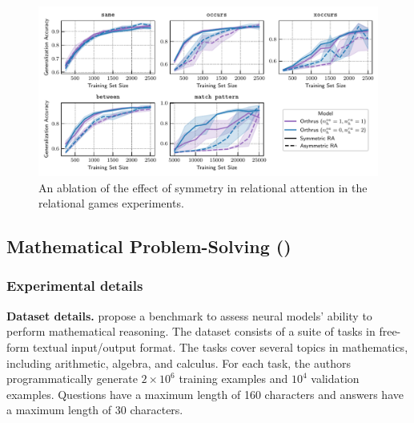 \begin{figure}[h]
    \centering
    \includegraphics[width=\textwidth]{figs/experiments/relgames/relgames_learning_curves_symmetry_ablation.pdf}
    \caption{An ablation of the effect of symmetry in relational attention in the relational games experiments.}\label{fig:relgames_symmetry_ablation}
\end{figure}

\subsection{Mathematical Problem-Solving ()}\label{ssec:appendix_math}

\subsubsection*{Experimental details}

\textbf{Dataset details.} \citet{saxtonAnalyzingMathematicalReasoning2019} propose a benchmark to assess neural models' ability to perform mathematical reasoning. The dataset consists of a suite of tasks in free-form textual input/output format. The tasks cover several topics in mathematics, including arithmetic, algebra, and calculus. For each task, the authors programmatically generate $2 \times 10^6$ training examples and $10^4$ validation examples. Questions have a maximum length of 160 characters and answers have a maximum length of 30 characters.


